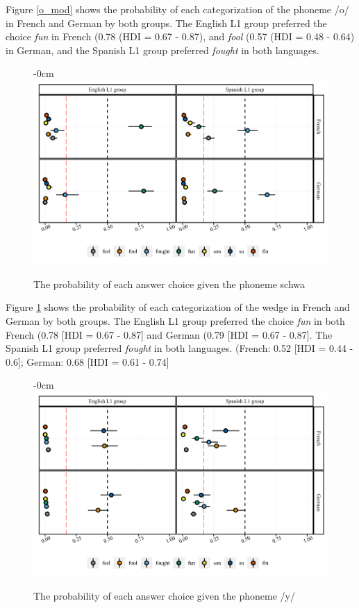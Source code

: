 \documentclass[preprints]{Definitions/mdpi}
\begin{document}
Figure \ref{o_mod} shows the probability of each categorization of the phoneme /o/ in French and German by both groups.
The English L1 group preferred the choice \emph{fun} in French (0.78 (HDI = 0.67 - 0.87), and \emph{fool} (0.57 (HDI = 0.48 - 0.64) in German, and the Spanish L1 group preferred \emph{fought} in both languages.

\begin{figure}[H]
\begin{adjustwidth}{-\extralength}{0cm}
\centering
\includegraphics[width=13.5cm]{figs/schwa_full.png}
\end{adjustwidth}
\caption{The probability of each answer choice given the phoneme schwa \label{schwa_mod}}
\end{figure}

Figure \ref{schwa_mod} shows the probability of each categorization of the wedge in French and German by both groups.
The English L1 group preferred the choice \emph{fun} in both French (0.78 {[}HDI = 0.67 - 0.87{]} and German (0.79 {[}HDI = 0.67 - 0.87{]}. The Spanish L1 group preferred \emph{fought} in both languages. (French: 0.52 {[}HDI = 0.44 - 0.6{]}; German: 0.68 {[}HDI = 0.61 - 0.74{]}

\begin{figure}[H]
\begin{adjustwidth}{-\extralength}{0cm}
\centering
\includegraphics[width=13.5cm]{figs/y_full.png}
\end{adjustwidth}
\caption{The probability of each answer choice given the phoneme /y/ \label{y_mod}}
\end{figure}
\end{document}

